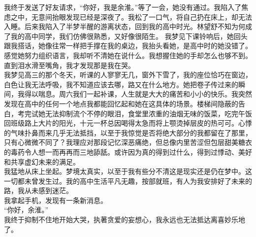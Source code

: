 \documentclass[letterpaper, 12pt]{article}
\begin{document}
\begin{multicols}{2}
我终于发送了好友请求，“你好，我是余淮。”等了一会，她没有通过。我陷入了焦虑之中，无意间抬眼发现已经是深夜了。我松了一口气，将自己扔在床上，却无法入睡。后来我陷入了半梦半醒的游离状态，回到我的高中时光。林望舒不知为何成了我的高中同学，我们仿佛很熟悉，又好像很陌生。
我梦见下课铃响后，她回头跟我搭话，她像往常一样把手撑在我的桌边，我抬头看她，是高中时的她没错了。感觉她努力组织语言，我却听不清她在说什么。我想握住她的手却怎么也够不到。直到泪水滑至嘴角，我才发现那是我在哭。\\

我梦见高三的那个冬天，听课的人寥寥无几，窗外下雪了，我的座位恰巧在窗边，白色让我无法呼吸，我不知道应该去哪，路又在什么地方。她把卷子传过来的瞬间，我得以喘息。周六我们一起补课，人生就是大大的痛苦和小小的快乐。我突然发现在高中的任何一个地点我都能回忆起和她在这具体的场景。楼梯间隐蔽的告白，考完试她无法抑制流个不停的眼泪，食堂里浓重的油烟无味的饭菜，吃完午饭回班级路上大片的阳光，十元一杯总因喝得太急而将上颚烫掉层皮的热可可。心悸的气味扑鼻而来几乎无法抵挡，以至于我惊觉是否将绝大部分的我都留在了那里，只有心微微不同了？我理应对那段记忆深恶痛绝，但总像内里苦涩但包层甜美糖衣的毒药令人想一而再再而三地舔舐。或许因为真的得到过什么，得到过悸动、美好和共享虚幻未来的满足。\\

我猛地从床上坐起。梦境太真实，以至于我有些分不清这是现实还是仍在梦中。这一切都未曾发生过。我的高中生活平凡无趣，按部就班，有人为我安排好了未来的路，我从未感到迷茫。\\

我拿起手机，发现有一条新消息。\\

“你好，余淮。”\\

我终于抑制不住地开始大哭，执著贪爱的妄想心，我永远也无法抵达离喜妙乐地了。\\

\end{multicols} 
\end{document}
